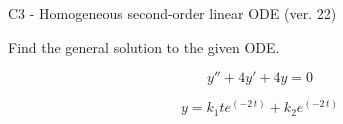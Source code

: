 \begin{exercise}
  \begin{exerciseTitle}C3 - Homogeneous second-order linear ODE (ver. 22)\end{exerciseTitle}
  \begin{exerciseStatement}
    
Find the general solution to the given ODE.

    
\[y''+4y'+4y = 0\]

  \end{exerciseStatement}
  \begin{exerciseAnswer}
    
\[y= k_{1} t e^{\left(-2 \, t\right)} + k_{2} e^{\left(-2 \, t\right)}\]

  \end{exerciseAnswer}
\end{exercise}
